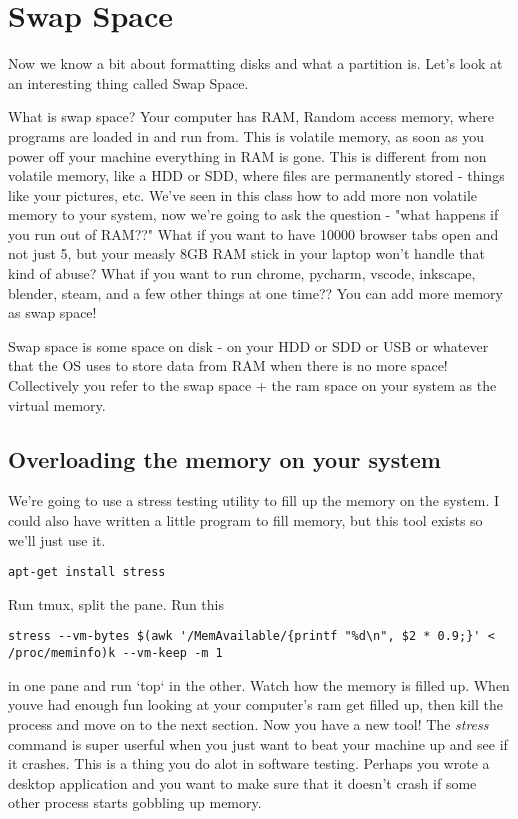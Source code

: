 \documentclass[10pt]{article}
\begin{document}
\section{Swap Space}

Now we know a bit about formatting disks and what a partition is. Let's look at
an interesting thing called Swap Space.


What is swap space? Your computer has RAM, Random access memory, where programs
are loaded in and run from. This is volatile memory, as soon as you power off
your machine everything in RAM is gone. This is different from non volatile
memory, like a HDD or SDD, where files are permanently stored - things like your
pictures, etc. We've seen in this class how to add more non volatile memory to
your system, now we're going to ask the question - "what happens if you run out
of RAM??" What if you want to have 10000 browser tabs open and not just 5, but
your measly 8GB RAM stick in your laptop won't handle that kind of abuse? What
if you want to run chrome, pycharm, vscode, inkscape, blender, steam, and a few
other things at one time?? You can add more memory as swap space!

Swap space is some space on disk - on your HDD or SDD or USB or whatever that
the OS uses to store data from RAM when  there is no more space! Collectively
you refer to the swap space + the ram space on your system as the virtual
memory.

\subsection{Overloading the memory on your system}
We're going to use a stress
testing utility to fill up the memory on the system. I could also have written a
little program to fill memory, but this tool exists so we'll just use it.

\begin{lstlisting}
apt-get install stress
\end{lstlisting}

Run tmux, split the pane. Run this 

\begin{lstlisting}
stress --vm-bytes $(awk '/MemAvailable/{printf "%d\n", $2 * 0.9;}' < /proc/meminfo)k --vm-keep -m 1
\end{lstlisting}

in one pane and run `top` in the other. Watch how the memory is filled up. When
youve had enough fun looking at your computer's ram get filled up, then kill the
process and move on to the next section. Now you have a new tool! The
\textit{stress} command is super userful when you just want to beat your machine
up and see if it crashes. This is a thing you do alot in software testing.
Perhaps you wrote a desktop application and you want to make sure that it
doesn't crash if some other process starts gobbling up memory.
\end{document}
